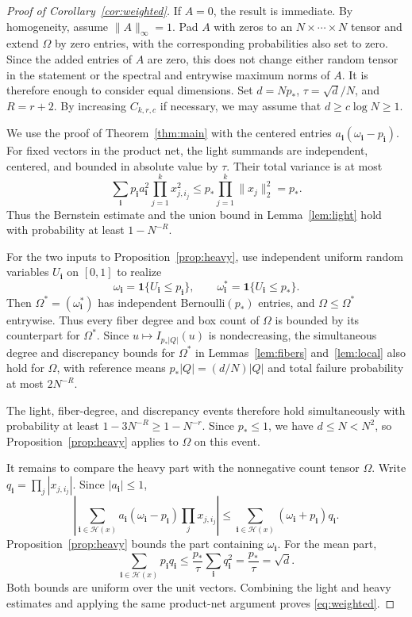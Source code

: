 \documentclass[10pt,a4paper]{amsart}
\numberwithin{equation}{section}
\newcommand{\one}{\mathbf 1}
\begin{document}
\begin{proof}[Proof of Corollary~\ref{cor:weighted}]
If $A=0$, the result is immediate. By homogeneity, assume
$\|A\|_\infty=1$.
Pad $A$ with zeros to an $N\times\cdots\times N$ tensor and extend
$\Omega$ by zero entries, with the corresponding probabilities also
set to zero. Since the added entries
of $A$ are zero, this does not change either random tensor in the
statement or the spectral and entrywise maximum norms of $A$. It is
therefore enough to consider equal dimensions. 
Set
$d=Np_*$, $\tau=\sqrt d/N$, and $R=r+2$.
By increasing $C_{k,r,c}$ if necessary, we may assume that
$d\ge c\log N\ge1$.

We use the proof of Theorem~\ref{thm:main} with the centered entries
$a_{\mathbf i}(\omega_{\mathbf i}-p_{\mathbf i})$. For fixed vectors
in the product net, the light summands are independent, centered, and
bounded in absolute value by $\tau$. Their total variance is at most
\[
 \sum_{\mathbf i}p_{\mathbf i}a_{\mathbf i}^2
        \prod_{j=1}^k x_{j,i_j}^2
 \le p_*\prod_{j=1}^k\|x_j\|_2^2=p_*.
\]
Thus the Bernstein estimate and the union bound in
Lemma~\ref{lem:light} hold with  probability at least $1-N^{-R}$.

For the two inputs to Proposition~\ref{prop:heavy}, use independent
uniform random variables $U_{\mathbf i}$ on $[0,1]$ to realize
\[
 \omega_{\mathbf i}=\one\{U_{\mathbf i}\le p_{\mathbf i}\},
 \qquad
 \omega^*_{\mathbf i}=\one\{U_{\mathbf i}\le p_*\}.
\]
Then $\Omega^*=(\omega^*_{\mathbf i})$ has independent
Bernoulli$(p_*)$ entries, and $\Omega\le\Omega^*$ entrywise.
Thus every fiber degree and box count of $\Omega$ is bounded by its
counterpart for $\Omega^*$. Since $u\mapsto I_{p_*|Q|}(u)$ is
nondecreasing, the simultaneous degree and discrepancy bounds for
$\Omega^*$ in Lemmas~\ref{lem:fibers} and~\ref{lem:local} also hold
for $\Omega$, with reference means $p_*|Q|=(d/N)|Q|$ and total failure
probability at most $2N^{-R}$.

The light, fiber-degree, and discrepancy events therefore hold
simultaneously with probability at least
$1-3N^{-R}\ge1-N^{-r}$. Since $p_*\le1$, we have
$d\le N<N^2$, so Proposition~\ref{prop:heavy} applies to $\Omega$
on this event.

It remains to compare the heavy part with the nonnegative count tensor
$\Omega$. Write $q_{\mathbf i}=\prod_j|x_{j,i_j}|$. Since
$|a_{\mathbf i}|\le1$,
\[
 \left|\sum_{\mathbf i\in\mathcal H(x)}
       a_{\mathbf i}(\omega_{\mathbf i}-p_{\mathbf i})
       \prod_jx_{j,i_j}\right|
 \le\sum_{\mathbf i\in\mathcal H(x)}
       (\omega_{\mathbf i}+p_{\mathbf i})q_{\mathbf i}.
\]
Proposition~\ref{prop:heavy} bounds the part containing
$\omega_{\mathbf i}$. For the mean part,
\[
 \sum_{\mathbf i\in\mathcal H(x)}p_{\mathbf i}q_{\mathbf i}
 \le\frac{p_*}{\tau}\sum_{\mathbf i}q_{\mathbf i}^2
 =\frac{p_*}{\tau}=\sqrt d.
\]
Both bounds are uniform over the unit vectors. Combining the light and
heavy estimates and applying the same product-net argument proves
\eqref{eq:weighted}.
\end{proof}
\end{document}
